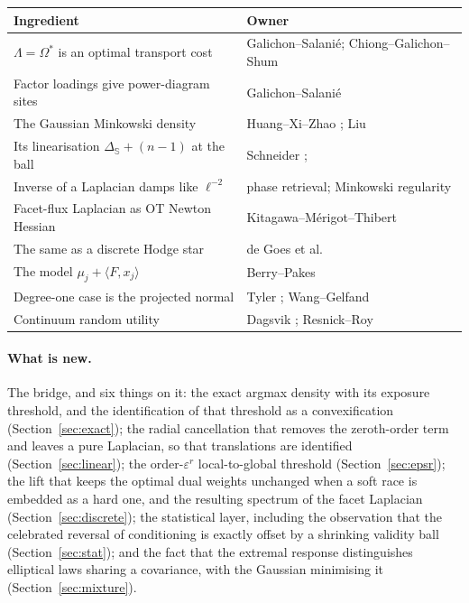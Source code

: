 \documentclass[11pt]{article}
\theoremstyle{definition}
\newcommand{\Sph}{\mathbb{S}}
\newcommand{\Lap}{\Delta_{\Sph}}
\begin{document}
\begin{center}\small
\begin{tabular}{ll}
\toprule
Ingredient & Owner \\
\midrule
$\Lambda=\Omega^{*}$ is an optimal transport cost & Galichon--Salani\'e; Chiong--Galichon--Shum \cite{GS,CGS}\\
Factor loadings give power-diagram sites & Galichon--Salani\'e \cite{GS}\\
The Gaussian Minkowski density & Huang--Xi--Zhao \cite{HXZ}; Liu \cite{LiuLp}\\
Its linearisation $\Lap+(n-1)$ at the ball & Schneider \cite{Schneider}; \cite{HXZ}\\
Inverse of a Laplacian damps like $\ell^{-2}$ & phase retrieval; Minkowski regularity \cite{Zuo}\\
Facet-flux Laplacian as OT Newton Hessian & Kitagawa--M\'erigot--Thibert \cite{KMT}\\
The same as a discrete Hodge star & de Goes et al.\ \cite{deGoes}\\
The model $\mu_{j}+\langle F,x_{j}\rangle$ & Berry--Pakes \cite{BerryPakes}\\
Degree-one case is the projected normal & Tyler \cite{Tyler}; Wang--Gelfand \cite{WangGelfand}\\
Continuum random utility & Dagsvik \cite{Dagsvik}; Resnick--Roy \cite{ResnickRoy}\\
\bottomrule
\end{tabular}
\end{center}

\paragraph{What is new.} The bridge, and six things on it: the exact argmax
density with its exposure threshold, and the identification of that threshold
as a convexification (Section~\ref{sec:exact}); the radial cancellation that
removes the zeroth-order term and leaves a pure Laplacian, so that translations
are identified (Section~\ref{sec:linear}); the order-$\varepsilon^{r}$
local-to-global threshold (Section~\ref{sec:epsr}); the lift that keeps the
optimal dual weights unchanged when a soft race is embedded as a hard one, and
the resulting spectrum of the facet Laplacian (Section~\ref{sec:discrete});
the statistical layer, including the observation that the celebrated reversal
of conditioning is exactly offset by a shrinking validity ball
(Section~\ref{sec:stat}); and the fact that the extremal response
distinguishes elliptical laws sharing a covariance, with the Gaussian
minimising it (Section~\ref{sec:mixture}).
\end{document}
